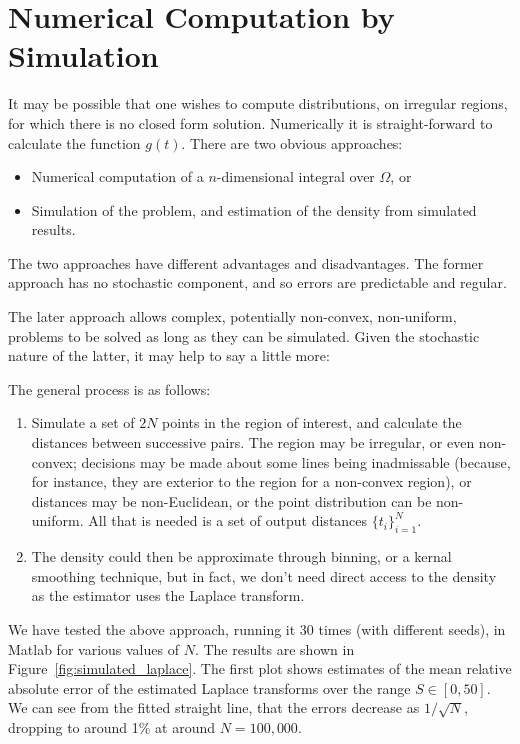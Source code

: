 \documentclass{article}
\begin{document}
\section{Numerical Computation by Simulation}
\label{sec:numerical}

It may be possible that one wishes to compute distributions, on
irregular regions, for which there is no closed form solution.
Numerically it is straight-forward to calculate the function
$g(t)$. There are two obvious approaches:
\begin{itemize}

\item Numerical computation of a $n$-dimensional integral over
  $\Omega$, or

\item Simulation of the problem, and estimation of the density from
  simulated results. 

\end{itemize}
The two approaches have different advantages and disadvantages. The
former approach has no stochastic component, and so errors are
predictable and regular. 

The later approach allows complex, potentially non-convex,
non-uniform, problems to be solved as long as they can be
simulated. Given the stochastic nature of the latter, it may help to
say a little more:

The general process is as follows:
\begin{enumerate}

\item Simulate a set of $2N$ points in the region of interest, and
  calculate the distances between successive pairs. The region may be
  irregular, or even non-convex; decisions may be made about some
  lines being inadmissable (because, for instance, they are exterior
  to the region for a non-convex region), or distances may be
  non-Euclidean, or the point distribution can be non-uniform. All
  that is needed is a set of output distances $\{ t_i \}_{i=1}^{N}$.

\item The density could then be approximate through binning, or a
  kernal smoothing technique, but in fact, we don't need direct access
  to the density as the estimator uses the Laplace transform.

\end{enumerate}

We have tested the above approach, running it 30 times (with different
seeds), in Matlab for various values of $N$. The results are shown in
Figure~\ref{fig:simulated_laplace}. The first plot shows estimates of
the mean relative absolute error of the estimated Laplace transforms
over the range $S \in [0, 50]$. We can see from the fitted straight
line, that the errors decrease as $1/\sqrt{N}$, dropping to around 1\%
at around $N=100,000$.
\end{document}
